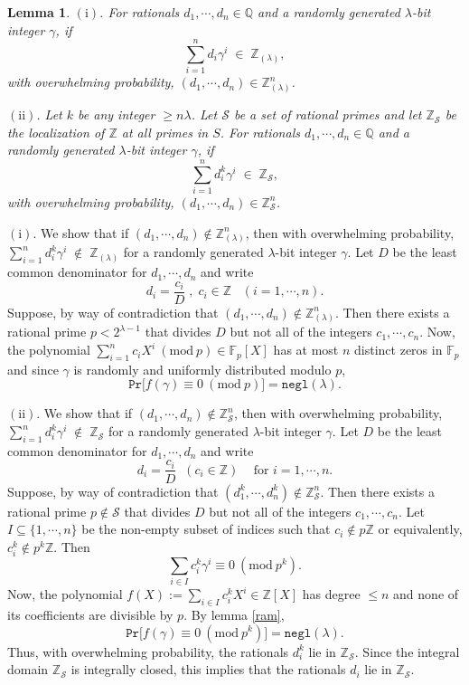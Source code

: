 \documentclass[11pt, lettersize, notitlepage, leqno, footskip=0.6cm]{article}
\newcommand{\bz}{\mathbb Z}
\newcommand{\bq}{\mathbb Q}
\newcommand{\bFp}{\mathbb{F}_p}
\newcommand{\slim}{\sum\limits}
\newcommand{\ttt}{\texttt}
\newcommand{\negl}{\ttt{{negl}}}
\newcommand{\mc}{\mathcal}
\newcommand{\mr}{\mathrm}
\newcommand{\lam}{\lambda}
\newcommand{\bzlam}{\bz_{(\lam)}}
\newcommand{\bzs}{\bz_{\mc{S}}}
\newcommand{\sub}{\subseteq}
\newcommand{\vs}{\vspace{-0.15cm}}
\newcommand{\noin}{\noindent}
\newcommand{\op}{overwhelming probability}
\newcommand{\Mod}[1]{\ (\mathrm{mod}\ #1)}
\newtheorem{Lem}[Thm]{Lemma}
\numberwithin{equation}{section}
\begin{document}
\vspace{0.15cm}

\begin{Lem} \label{integers} $\mr{(i)}$. For rationals $d_1,\cdots, d_n\in \bq$ and a randomly generated $\lam$-bit integer $\gamma$, if \vs $$\sum_{i=1}^n d_i\gamma^i\; \in \;\bzlam,$$ with \op, $(d_1,\cdots, d_n)\in \bzlam^n$.\vspace{0.1cm}

\noin $\mr{(ii)}$. Let $k$ be any integer $\geq n\lam$. Let $\mc{S}$ be a set of rational primes and let $\bz_{\mc{S}}$ be the localization of $\bz$ at all primes in $S$. For rationals $d_1,\cdots, d_n\in \bq$ and a randomly generated $\lam$-bit integer $\gamma$, if \vs $$\sum_{i=1}^n d_i^{k}\gamma^i\; \in \;\bz_{\mc{S}},$$ with \op, $(d_1,\cdots, d_n)\in \bz_{\mc{S}}^n$.
\end{Lem}

\begin{prf} $\mr{(i)}$. We show that if $(d_1,\cdots,d_n)\notin \bzlam^n$, then with \op, $\sum\limits_{i=1}^n d_i^{k}\gamma^i\; \notin \;\bzlam$ for a randomly generated $\lam$-bit integer $\gamma$. Let $D$ be the least common denominator for $d_1,\cdots, d_n$ and write \vs $$d_i = \frac{c_i}{D}\;,\; c_i\in\bz\; \;\;(i=1,\cdots, n).$$ Suppose, by way of contradiction that $(d_1,\cdots, d_n )\notin \bzlam^n$. Then there exists a rational prime $p < 2^{\lam-1}$ that divides $D$ but not all of the integers $c_1,\cdots,c_n$. Now, the polynomial $\sum_{i=1}^n c_iX^i\Mod{p} \in \bFp[X]$ has at most $n$ distinct zeros in $\bFp$ and since $\gamma$ is randomly and uniformly distributed modulo $p$, \vs $$\ttt{Pr}\big[f(\gamma)\equiv 0\Mod{p} \big] = \negl(\lam).$$

\vspace{0.15cm} 

\noin $\mr{(ii)}$. We show that if $(d_1,\cdots,d_n)\notin \bzs^n$, then with \op, $\sum_{i=1}^n d_i^{k}\gamma^i\; \notin \;\bz_{\mc{S}}$ for a randomly generated $\lam$-bit integer $\gamma$. Let $D$ be the least common denominator for $d_1,\cdots, d_n$ and write \vs $$d_i = \frac{c_i}{D}\;\; (c_i\in \bz)\;\;\; \text{ for } i=1,\cdots, n.$$ Suppose, by way of contradiction that $(d_1^{k},\cdots, d_n^{k} )\notin \bz_{\mc{S}}^n$. Then there exists a rational prime $p\notin \mc{S}$ that divides $D$ but not all of the integers $c_1,\cdots,c_n$. Let $I\sub \{1,\cdots,n  \}$ be the non-empty subset of indices such that $c_i\notin p\bz$ or equivalently, $c_i^{k}\notin p^{k}\bz$. Then \vs $$\slim_{i\in I} c_i^{k}\gamma^i \equiv 0\Mod{p^{k}}.$$ Now, the polynomial $f(X):= \slim_{i\in I} c_i^{k} X^i\in \bz[X]$ has degree $\leq n$ and none of its coefficients are divisible by $p$. By lemma \ref{ram}, \vs $$\ttt{Pr}\big[f(\gamma)\equiv 0\Mod{p^{k}} \big] = \negl(\lam).$$ Thus, with \op, the rationals $d_i^{k}$ lie in $\bz_{\mc{S}}$. Since the integral domain $\bz_{\mc{S}}$ is integrally closed, this implies that the rationals $d_i$ lie in $\bz_{\mc{S}}$.\end{prf}
\end{document}
